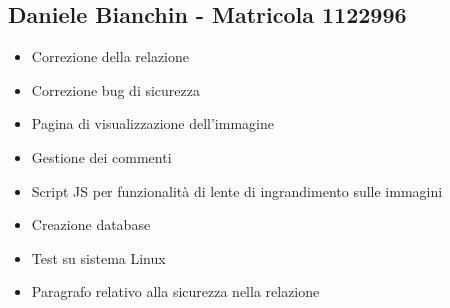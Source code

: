 \documentclass[openany, a4paper, 12pt]{report}
\begin{document}
	\subsection{Daniele Bianchin - Matricola 1122996}
	\begin{itemize}
		\item Correzione della relazione
		\item Correzione bug di sicurezza
		\item Pagina di visualizzazione dell'immagine
		\item Gestione dei commenti
		\item Script JS per funzionalità di lente di ingrandimento sulle immagini
		\item Creazione database
		\item Test su sistema Linux
		\item Paragrafo relativo alla sicurezza nella relazione
	\end{itemize}
\end{document}
